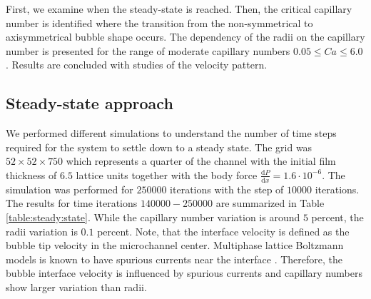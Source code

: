 \documentclass[preprint,12pt]{elsarticle}
\begin{document}
First, we examine when the steady-state is
reached. Then, the critical capillary number is identified where the transition from the
non-symmetrical to axisymmetrical bubble shape occurs. The dependency of the radii on the capillary
number is presented for the range of moderate capillary numbers $0.05 \leq Ca \leq 6.0$. Results are
concluded with studies of the velocity pattern.

\subsection{Steady-state approach}
\label{sec:steady:state}
We performed different simulations to understand the number of time steps required for the
system to
settle down to a steady state. The grid  was $52 \times 52 \times 750$ which represents
a quarter of the channel with the initial film thickness of $6.5$ lattice units together
with the body force $\frac{\mathrm{d}P}{\mathrm{d}x}=1.6
\cdot 10^{-6}$. The simulation was performed for $250000$ iterations with the step of
$10000$ iterations. The results for time iterations $140000-250000$ are summarized in Table
\ref{table:steady:state}. While the
capillary number variation is around $5$ percent, the radii variation is $0.1$ percent. Note, that
the interface velocity is defined as the bubble tip velocity in the microchannel center. Multiphase
lattice Boltzmann models is known to have spurious currents near the interface
\cite{pooley-spurious,shan-spurious}. Therefore, the bubble interface velocity is influenced by
spurious currents and capillary numbers show larger variation than radii. 
\end{document}

